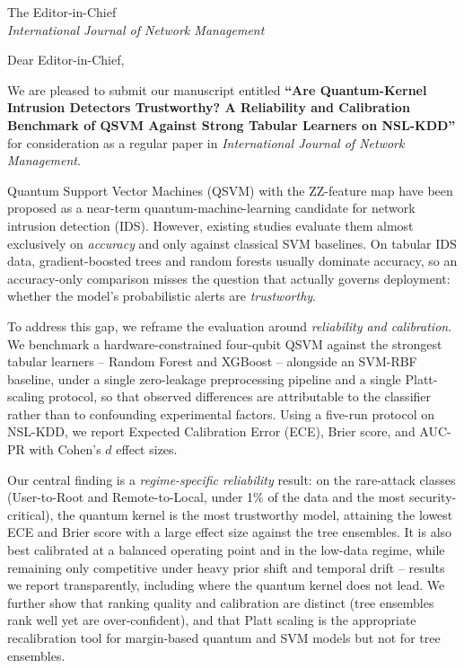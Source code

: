 \documentclass[11pt]{letter}
\begin{document}
\begin{letter}{%
  The Editor-in-Chief\\
  \textit{International Journal of Network Management}}

\opening{Dear Editor-in-Chief,}

We are pleased to submit our manuscript entitled \textbf{``Are Quantum-Kernel
Intrusion Detectors Trustworthy? A Reliability and Calibration Benchmark of QSVM
Against Strong Tabular Learners on NSL-KDD''} for consideration as a regular paper
in \textit{International Journal of Network Management}.

Quantum Support Vector Machines (QSVM) with the ZZ-feature map have been proposed as
a near-term quantum-machine-learning candidate for network intrusion detection (IDS).
However, existing studies evaluate them almost exclusively on \emph{accuracy} and only
against classical SVM baselines. On tabular IDS data, gradient-boosted trees and random
forests usually dominate accuracy, so an accuracy-only comparison misses the question
that actually governs deployment: whether the model's probabilistic alerts are
\emph{trustworthy}.

To address this gap, we reframe the evaluation around \emph{reliability and
calibration}. We benchmark a hardware-constrained four-qubit QSVM against the strongest
tabular learners -- Random Forest and XGBoost -- alongside an SVM-RBF baseline, under a
single zero-leakage preprocessing pipeline and a single Platt-scaling protocol, so that
observed differences are attributable to the classifier rather than to confounding
experimental factors. Using a five-run protocol on NSL-KDD, we report Expected
Calibration Error (ECE), Brier score, and AUC-PR with Cohen's $d$ effect sizes.

Our central finding is a \emph{regime-specific reliability} result: on the rare-attack
classes (User-to-Root and Remote-to-Local, under 1\% of the data and the most
security-critical), the quantum kernel is the most trustworthy model, attaining the
lowest ECE and Brier score with a large effect size against the tree ensembles. It is
also best calibrated at a balanced operating point and in the low-data regime, while
remaining only competitive under heavy prior shift and temporal drift -- results we
report transparently, including where the quantum kernel does not lead. We further show
that ranking quality and calibration are distinct (tree ensembles rank well yet are
over-confident), and that Platt scaling is the appropriate recalibration tool for
margin-based quantum and SVM models but not for tree ensembles.


\end{letter}
\end{document}
